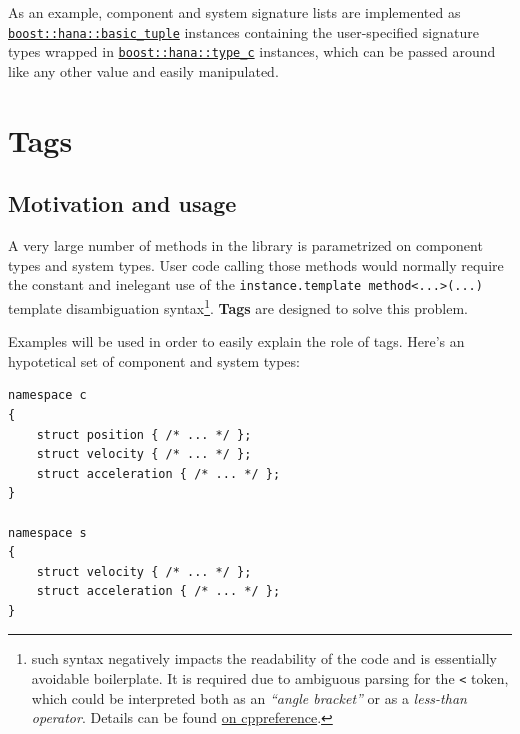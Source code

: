 \documentclass[twoside, 12pt, a4paper, openany]{book}
\begin{document}
As an example, component and system signature lists are implemented as
\href{http://www.boost.org/doc/libs/1_61_0/libs/hana/doc/html/structboost_1_1hana_1_1basic__tuple.html}{\texttt{boost::hana::basic_tuple}}
instances containing the user-specified signature types wrapped in
\href{http://www.boost.org/doc/libs/1_61_0/libs/hana/doc/html/structboost_1_1hana_1_1type.html\#ae35139e732c4b75e91061513cf445628}{\texttt{boost::hana::type_c}}
instances, which can be passed around like any other value and easily
manipulated.

\hypertarget{metaprogramming_tags}{\section{Tags}\label{metaprogramming_tags}}

\subsection{Motivation and usage}\label{motivation-and-usage}

A very large number of methods in the library is parametrized on
component types and system types. User code calling those methods would
normally require the constant and inelegant use of the
\texttt{instance.template method<...>(...)}
template disambiguation syntax\footnote{such syntax negatively impacts
  the readability of the code and is essentially avoidable boilerplate.
  It is required due to ambiguous parsing for the
  \texttt{<}
  token, which could be interpreted both as an \emph{``angle bracket''}
  or as a \emph{less-than operator}. Details can be found
  \href{http://en.cppreference.com/w/cpp/language/dependent_name\#The_template_disambiguator_for_dependent_names}{on
  cppreference}.}. \textbf{Tags} are designed to solve this problem.

Examples will be used in order to easily explain the role of tags.
Here's an hypotetical set of component and system types:

\begin{verbatim}
namespace c
{
    struct position { /* ... */ };
    struct velocity { /* ... */ };
    struct acceleration { /* ... */ };
}

namespace s
{
    struct velocity { /* ... */ };
    struct acceleration { /* ... */ };
}
\end{verbatim}
\end{document}
